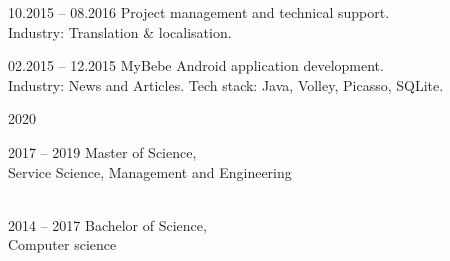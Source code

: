 \documentclass[12pt, a4paper]{article}
\newcommand{\sectionSpace}{16pt}
\begin{document}
\begin{minipage}[t]{0.6\textwidth}
    \begin{subsec}{}{10.2015 – 08.2016}
        \>  Project management and technical support.   \\
        \>  Industry: Translation \& localisation.      \\
    \end{subsec}

    \begin{subsec}{}{02.2015 – 12.2015}
        \> MyBebe Android application development.              \\
        \> Industry: News and Articles.                         \lineend
        \> Tech stack: Java, Volley, Picasso, SQLite.           \\
    \end{subsec}
    
    
    \vspace{\sectionSpace}
    
    \begin{subsec}{}{2020}
        \>  \\
    \end{subsec}
    
    \begin{subsec}{}{2017 – 2019}
        \> Master of Science,  \\
        \> Service Science, Management and Engineering \\
        \>  \\
    \end{subsec}
    
    \begin{subsec}{}{2014 – 2017}
        \> Bachelor of Science,  \\
        \> Computer science \\
    \end{subsec}
\end{minipage}
\end{document}
